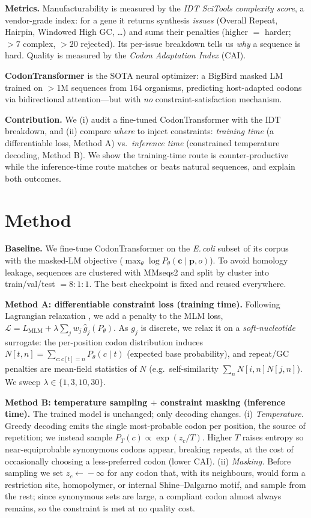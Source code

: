 \documentclass{article}
\begin{document}
\textbf{Metrics.} Manufacturability is measured by the \emph{IDT SciTools complexity score}, a vendor-grade index: for a gene it returns synthesis \emph{issues} (Overall Repeat, Hairpin, Windowed High GC, \dots) and sums their penalties (higher $=$ harder; $>7$ complex, $>20$ rejected). Its per-issue breakdown tells us \emph{why} a sequence is hard. Quality is measured by the \emph{Codon Adaptation Index} (CAI).

\textbf{CodonTransformer} \cite{codontransformer} is the SOTA neural optimizer: a BigBird \cite{bigbird} masked LM trained on $>$1M sequences from 164 organisms, predicting host-adapted codons via bidirectional attention---but with \emph{no} constraint-satisfaction mechanism.

\textbf{Contribution.} We (i) audit a fine-tuned CodonTransformer with the IDT breakdown, and (ii) compare \emph{where} to inject constraints: \emph{training time} (a differentiable loss, Method A) vs.\ \emph{inference time} (constrained temperature decoding, Method B). We show the training-time route is counter-productive while the inference-time route matches or beats natural sequences, and explain both outcomes.

\section{Method}

\textbf{Baseline.} We fine-tune CodonTransformer on the \emph{E.\,coli} subset of its corpus with the masked-LM objective ($\max_\theta \log P_\theta(\mathbf c\mid\mathbf p,o)$). To avoid homology leakage, sequences are clustered with MMseqs2 \cite{mmseqs2} and split by cluster into train/val/test $=8{:}1{:}1$. The best checkpoint is fixed and reused everywhere.

\textbf{Method A: differentiable constraint loss (training time).} Following Lagrangian relaxation \cite{bertsekas}, we add a penalty to the MLM loss, $\mathcal L = L_{\mathrm{MLM}} + \lambda\sum_j w_j\,\hat g_j(P_\theta)$. As $g_j$ is discrete, we relax it on a \emph{soft-nucleotide} surrogate: the per-position codon distribution induces $N[t,n]=\sum_{c:c[t]=n}P_\theta(c\mid t)$ (expected base probability), and repeat/GC penalties are mean-field statistics of $N$ (e.g.\ self-similarity $\sum_n N[i,n]N[j,n]$). We sweep $\lambda\in\{1,3,10,30\}$.

\textbf{Method B: temperature sampling $+$ constraint masking (inference time).} The trained model is unchanged; only decoding changes. (i) \emph{Temperature.} Greedy decoding emits the single most-probable codon per position, the source of repetition; we instead sample $P_T(c)\propto\exp(z_c/T)$. Higher $T$ raises entropy so near-equiprobable synonymous codons appear, breaking repeats, at the cost of occasionally choosing a less-preferred codon (lower CAI). (ii) \emph{Masking.} Before sampling we set $z_c\!\leftarrow\!-\infty$ for any codon that, with its neighbours, would form a restriction site, homopolymer, or internal Shine--Dalgarno motif, and sample from the rest; since synonymous sets are large, a compliant codon almost always remains, so the constraint is met at no quality cost.
\end{document}
